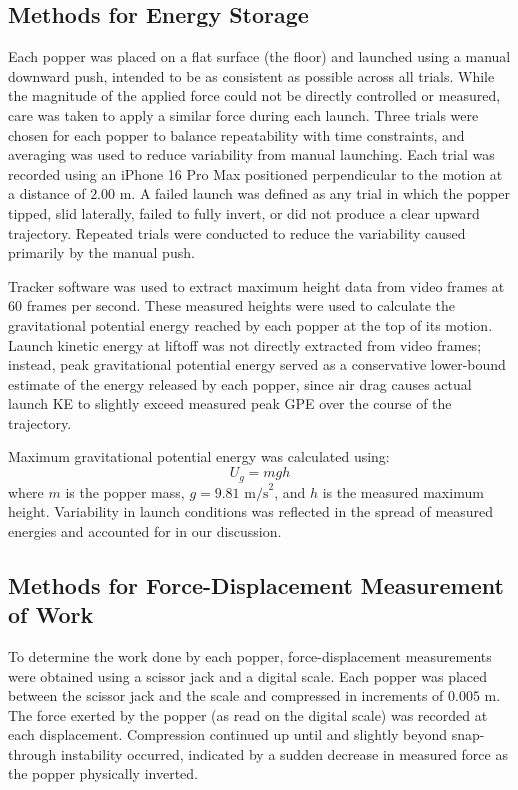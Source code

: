 \documentclass[12pt]{article}
\begin{document}
\subsection{Methods for Energy Storage}
Each popper was placed on a flat surface (the floor) and launched using a manual downward push, intended to be as consistent as possible across all trials. While the magnitude of the applied force could not be directly controlled or measured, care was taken to apply a similar force during each launch. Three trials were chosen for each popper to balance repeatability with time constraints, and averaging was used to reduce variability from manual launching. Each trial was recorded using an iPhone 16 Pro Max positioned perpendicular to the motion at a distance of $2.00\text{ m}$. A failed launch was defined as any trial in which the popper tipped, slid laterally, failed to fully invert, or did not produce a clear upward trajectory. Repeated trials were conducted to reduce the variability caused primarily by the manual push.

Tracker software was used to extract maximum height data from video frames at 60 frames per second. These measured heights were used to calculate the gravitational potential energy reached by each popper at the top of its motion. Launch kinetic energy at liftoff was not directly extracted from video frames; instead, peak gravitational potential energy served as a conservative lower-bound estimate of the energy released by each popper, since air drag causes actual launch KE to slightly exceed measured peak GPE over the course of the trajectory.

Maximum gravitational potential energy was calculated using:
$$U_g = mgh$$
where $m$ is the popper mass, $g = 9.81\text{ m/s}^2$, and $h$ is the measured maximum height. Variability in launch conditions was reflected in the spread of measured energies and accounted for in our discussion.

\subsection{Methods for Force-Displacement Measurement of Work}
To determine the work done by each popper, force-displacement measurements were obtained using a scissor jack and a digital scale. Each popper was placed between the scissor jack and the scale and compressed in increments of $0.005\text{ m}$. The force exerted by the popper (as read on the digital scale) was recorded at each displacement. Compression continued up until and slightly beyond snap-through instability occurred, indicated by a sudden decrease in measured force as the popper physically inverted.
\end{document}
